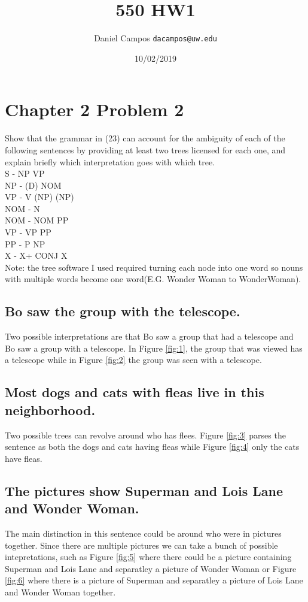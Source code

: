 \documentclass{article}
\begin{document}
\title{550 HW1}
\author{Daniel Campos  \tt {dacampos@uw.edu}}
\date{10/02/2019}
\maketitle 
\section{Chapter 2 Problem 2}
Show that the grammar in (23) can account for the ambiguity of each of the following
sentences by providing at least two trees licensed for each one, and explain briefly which
interpretation goes with which tree. \\
S - NP VP \\
NP - (D) NOM \\
VP - V (NP) (NP) \\
NOM - N \\
NOM - NOM PP \\
VP - VP PP \\
PP - P NP \\
X - X+ CONJ X \\
Note: the tree software I used required turning each node into one word so nouns with multiple words become one word(E.G. Wonder Woman to WonderWoman).
\subsection{Bo saw the group with the telescope.}
Two possible interpretations are that Bo saw a group that had a telescope and Bo saw a group with a telescope. In Figure  \ref{fig:1}, the group that was viewed has a telescope while in Figure  \ref{fig:2} the group was seen with a telescope.
\subsection{Most dogs and cats with fleas live in this neighborhood.}
Two possible trees can revolve around who has flees. Figure  \ref{fig:3} parses the sentence as both the dogs and cats having fleas while Figure  \ref{fig:4} only the cats have fleas.
\subsection{The pictures show Superman and Lois Lane and Wonder Woman.}
The main distinction in this sentence could be around who were in pictures together. Since there are multiple pictures we can take a bunch of possible intepretations, such as Figure  \ref{fig:5} where there could be a picture containing Superman and Lois Lane and separatley a picture of Wonder Woman or Figure  \ref{fig:6} where there is a picture of Superman and separatley a picture of Lois Lane and Wonder Woman together.
\\
\end{document}
